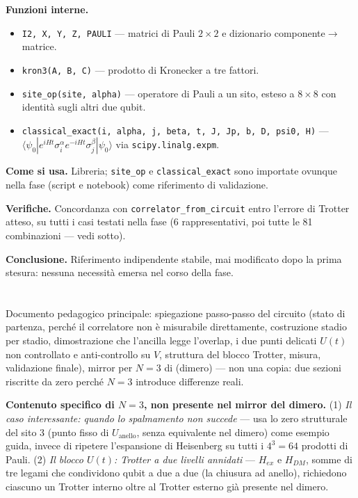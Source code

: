 \documentclass[11pt,a4paper]{article}
\begin{document}
\textbf{Funzioni interne.}
\begin{itemize}
\item \texttt{I2, X, Y, Z, PAULI} — matrici di Pauli $2\times2$ e dizionario
componente$\to$matrice.
\item \texttt{kron3(A,\ B,\ C)} — prodotto di Kronecker a tre fattori.
\item \texttt{site\_op(site,\ alpha)} — operatore di Pauli a un sito, esteso a
$8\times8$ con identità sugli altri due qubit.
\item \texttt{classical\_exact(i,\ alpha,\ j,\ beta,\ t,\ J,\ Jp,\ b,\ D,\ psi0,\
H)} — $\langle\psi_0|e^{iHt}\sigma_i^\alpha e^{-iHt}\sigma_j^\beta|\psi_0\rangle$
via \texttt{scipy.linalg.expm}.
\end{itemize}

\textbf{Come si usa.} Libreria; \texttt{site\_op} e \texttt{classical\_exact} sono
importate ovunque nella fase (script e notebook) come riferimento di validazione.

\textbf{Verifiche.} Concordanza con \texttt{correlator\_from\_circuit} entro
l'errore di Trotter atteso, su tutti i casi testati nella fase (6 rappresentativi,
poi tutte le 81 combinazioni — vedi sotto).

\textbf{Conclusione.} Riferimento indipendente stabile, mai modificato dopo la
prima stesura: nessuna necessità emersa nel corso della fase.

\section*{\texttt{}}

Documento pedagogico principale: spiegazione passo-passo del circuito (stato di
partenza, perché il correlatore non è misurabile direttamente, costruzione stadio
per stadio, dimostrazione che l'ancilla legge l'overlap, i due punti delicati
$U(t)$ non controllato e anti-controllo su $V$, struttura del blocco Trotter,
misura, validazione finale), mirror per $N=3$ di
\texttt{} (dimero) — non una copia:
due sezioni riscritte da zero perché $N=3$ introduce differenze reali.

\textbf{Contenuto specifico di $N=3$, non presente nel mirror del dimero.}
(1) \emph{Il caso interessante: quando lo spalmamento non succede} — usa lo zero
strutturale del sito 3 (punto fisso di $U_\text{anello}$, senza equivalente nel
dimero) come esempio guida, invece di ripetere l'espansione di Heisenberg su tutti
i $4^3=64$ prodotti di Pauli. (2) \emph{Il blocco $U(t)$: Trotter a due livelli
annidati} — $H_{ex}$ e $H_{DM}$, somme di tre legami che condividono qubit a due a
due (la chiusura ad anello), richiedono ciascuno un Trotter interno oltre al
Trotter esterno già presente nel dimero.
\end{document}
